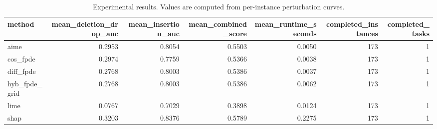 \begin{table}[t]
\caption{Experimental results. Values are computed from per-instance perturbation curves.}
\label{tab:main_results_computed}
\centering
\begin{tabular}{lrrrrrr}
\toprule
method & mean\_deletion\_drop\_auc & mean\_insertion\_auc & mean\_combined\_score & mean\_runtime\_seconds & completed\_instances & completed\_tasks \\
\midrule
aime & 0.2953 & 0.8054 & 0.5503 & 0.0050 & 173 & 1 \\
cos\_fpde & 0.2974 & 0.7759 & 0.5366 & 0.0038 & 173 & 1 \\
diff\_fpde & 0.2768 & 0.8003 & 0.5386 & 0.0037 & 173 & 1 \\
hyb\_fpde\_grid & 0.2768 & 0.8003 & 0.5386 & 0.0062 & 173 & 1 \\
lime & 0.0767 & 0.7029 & 0.3898 & 0.0124 & 173 & 1 \\
shap & 0.3203 & 0.8376 & 0.5789 & 0.2275 & 173 & 1 \\
\bottomrule
\end{tabular}

\end{table}
